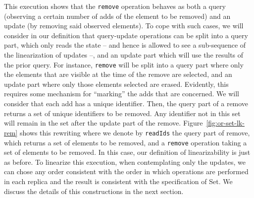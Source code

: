 This execution shows that 
the \lstinline|remove| operation behaves as both a query
(observing a certain number of adds of the element to be removed)
and an update (by removing said observed elements).
%
To cope with such cases, we will consider in our definition that
query-update operations can be split into a query part, which only
reads the state -- and hence is allowed to see a sub-sequence of the
linearization of updates --, and an update part which will use the
results of the prior query.
%
For instance, \lstinline|remove| will be split into a query part where
only the elements that are visible at the time of the remove are
selected, and an update part where only those elements selected are
erased.
%
Evidently, this requires some mechanism for ``marking'' the adds that
are concerned.
%
We will consider that each add has a unique identifier.
%
Then, the query part of a remove returns a set of unique identifiers
to be removed.
%
Any identifier not in this set will remain in the set after the update
part of the remove.
%
Figure~\ref{fig:or-set-lk-rem} shows this rewriting
where we denote by \lstinline|readIds| the query part of
remove, which returns a set of elements to be removed, and a
\lstinline|remove| operation taking a set of elements to be removed.
%
In this case, our definition of linearizability is just as before.
%
To linearize this execution, when contemplating only the updates, we
can chose any order consistent with the order in which operations are
performed in each replica and the result is consistent with the
specification of Set.
%
We discuss the details of this constructions in the next section.



